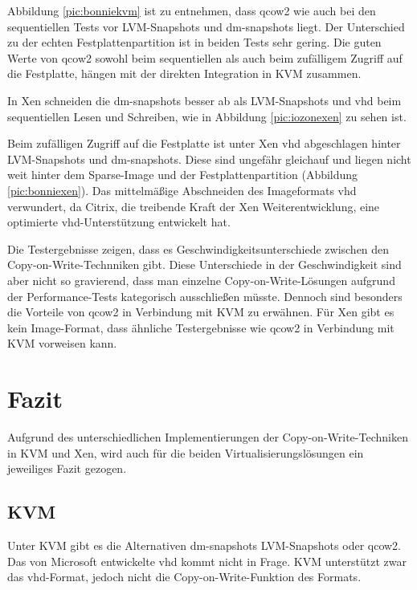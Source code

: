 Abbildung \ref{pic:bonniekvm} ist zu entnehmen, dass qcow2 wie auch bei den sequentiellen Tests vor LVM-Snapshots und dm-snapshots liegt. Der Unterschied zu der echten Festplattenpartition ist in beiden Tests sehr gering. Die guten Werte von qcow2 sowohl beim sequentiellen als auch beim zufälligem Zugriff auf die Festplatte, hängen mit der direkten Integration in KVM zusammen.

In Xen schneiden die dm-snapshots besser ab als LVM-Snapshots und vhd beim sequentiellen Lesen und Schreiben, wie in Abbildung \ref{pic:iozonexen} zu sehen ist. 

Beim zufälligen Zugriff auf die Festplatte ist unter Xen vhd abgeschlagen hinter LVM-Snapshots und dm-snapshots. Diese sind ungefähr gleichauf und liegen nicht weit hinter dem Sparse-Image und der Festplattenpartition (Abbildung \ref{pic:bonniexen}). Das mittelmäßige Abschneiden des Imageformats vhd verwundert, da Citrix, die treibende Kraft der Xen Weiterentwicklung, eine optimierte vhd-Unterstützung entwickelt hat. \cite{citrixvhd}

Die Testergebnisse zeigen, dass es Geschwindigkeitsunterschiede zwischen den Copy-on-Write-Technniken gibt. Diese Unterschiede in der Geschwindigkeit sind aber nicht so gravierend, dass man einzelne Copy-on-Write-Lösungen aufgrund der Performance-Tests kategorisch ausschließen müsste. Dennoch sind besonders die Vorteile von qcow2 in Verbindung mit KVM zu erwähnen. Für Xen gibt es kein Image-Format, dass ähnliche Testergebnisse wie qcow2 in Verbindung mit KVM vorweisen kann. 

\section{Fazit}
Aufgrund des unterschiedlichen Implementierungen der Copy-on-Write-Techniken in KVM und Xen, wird auch für die beiden Virtualisierungslösungen ein jeweiliges Fazit gezogen.

\subsection{KVM}
Unter KVM gibt es die Alternativen dm-snapshots LVM-Snapshots oder qcow2. Das von Microsoft entwickelte vhd kommt nicht in Frage. KVM unterstützt zwar das vhd-Format, jedoch nicht die Copy-on-Write-Funktion des Formats. 

